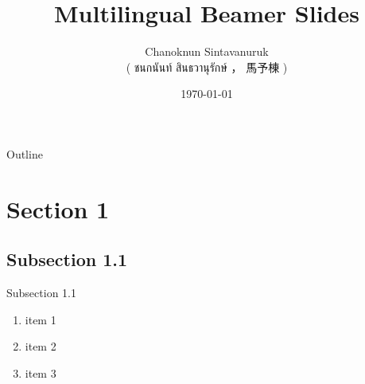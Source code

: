 \documentclass{beamer}
\title{Multilingual Beamer Slides}
\author[shortname]{
	Chanoknun Sintavanuruk \\ ( ชนกนันท์ สินธวานุรักษ์ ， 馬予棟 ) \inst{1}
}
\institute[shortinst]{\inst{1} affiliation
}
\date{\today}
\begin{document}
\begin{frame}
	\titlepage
\end{frame}

\begin{frame}{Outline}
	\tableofcontents
\end{frame}

\section{Section 1}
\subsection{Subsection 1.1}
\begin{frame}{Subsection 1.1}
	\begin{enumerate}
		\item<1-> item 1
		\item<2-> item 2
		\item<3-> item 3
	\end{enumerate}
\end{frame}
\end{document}
